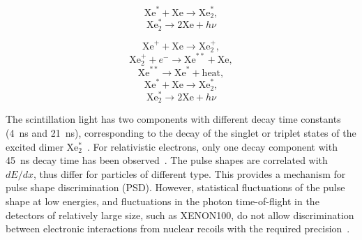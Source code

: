 \begin{equation}
\label{eqScint1}
\text{Xe}^{*} + \text{Xe} \rightarrow \text{Xe}^{*}_{2},
\end{equation}
\begin{equation}
\label{eqScint2}
\text{Xe}_{2}^{*} \rightarrow 2\text{Xe} + h\nu
\end{equation}

\begin{equation}
\label{eqScint3}
\text{Xe}^{+} + \text{Xe} \rightarrow \text{Xe}^{+}_{2},
\end{equation}
\begin{equation}
\label{eqScint4}
\text{Xe}^{+}_{2} + e^{-} \rightarrow \text{Xe}^{**} + \text{Xe},
\end{equation}
\begin{equation}
\label{eqScint5}
\text{Xe}^{**} \rightarrow \text{Xe}^{*} + \text{heat},
\end{equation}
\begin{equation}
\label{eqScint6}
\text{Xe}^{*} + \text{Xe} \rightarrow \text{Xe}^{*}_{2},
\end{equation}
\begin{equation}
\label{eqScint7}
\text{Xe}^{*}_{2} \rightarrow 2\text{Xe} + h\nu
\end{equation}

The scintillation light has two components with different decay time constants (4~ns and 21~ns), corresponding to the decay of the singlet or triplet states of the excited dimer  Xe$^{*}_{2}$~\cite{SingletTriplet, SingletTriplet_dEdx}. For relativistic electrons, only one decay component with 45~ns decay time has been observed~\cite{SingletTriplet}. The pulse shapes are correlated with $dE/dx$, thus differ for particles of different type. This provides a mechanism for pulse shape discrimination (PSD). However, statistical fluctuations of the pulse shape at low energies, and fluctuations in the photon time-of-flight in the detectors of relatively large size, such as XENON100, do not allow discrimination between electronic interactions from nuclear recoils with the required precision~\cite{XenonPSD}.



